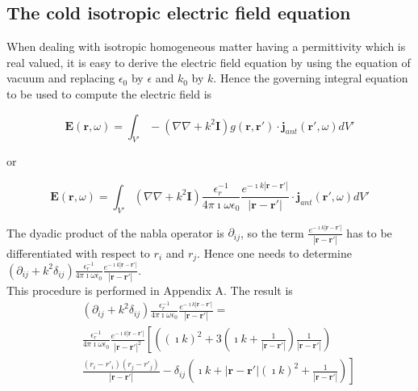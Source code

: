 \documentclass[a4paper,11pt]{thesis}
\begin{document}
\subsection{The cold isotropic electric field equation}
When dealing with isotropic homogeneous matter having a permittivity which is real valued, it is easy to derive the electric field equation by using the equation of vacuum and replacing $\epsilon_0$ by $\epsilon$ and $k_0$ by $k$. Hence the governing integral equation to be used to compute the electric field is

\begin{equation}
    \mathbf{E}(\mathbf{r},\omega)=\int_{V'} -\left(  \nabla  \nabla   + k^2 \mathbf{I} \right) g(\mathbf{r},\mathbf{r'})\cdot \mathbf{j}_{ant}(\mathbf{r'},\omega) dV'\label{E_vacuum}
\end{equation}

or

\begin{equation}
    \mathbf{E}(\mathbf{r},\omega)=\int_{V'} \left(  \nabla  \nabla   + k^2 \mathbf{I} \right) \frac{\epsilon_r^{-1}}{4 \pi \imath \omega \epsilon_0} \frac{e^{- \imath k | \mathbf{r}-\mathbf{r'} |}}{| \mathbf{r}-\mathbf{r'} |}\cdot \mathbf{j}_{ant}(\mathbf{r'},\omega) dV'\label{E_vacuum_2}
\end{equation}

The dyadic product of the nabla operator is $\partial_{ij}$, so the term $\frac{e^{- \imath k  | \mathbf{r}-\mathbf{r'} |}}{| \mathbf{r}-\mathbf{r'} |}$ has to be differentiated with respect to $r_i$ and $r_j$. Hence one needs to determine $\left(  \partial_{ij}   + k^2 \delta_{ij} \right) \frac{\epsilon_r^{-1}}{4 \pi \imath \omega \epsilon_0} \frac{e^{- \imath k  | \mathbf{r}-\mathbf{r'} |}}{| \mathbf{r}-\mathbf{r'} |}$.\\

This procedure is performed in Appendix A. The result is
\label{derive}
\begin{eqnarray}
&&\left(  \partial_{ij}   + k^2 \delta_{ij} \right) \frac{\epsilon_r^{-1}}{4 \pi \imath \omega \epsilon_0} \frac{e^{- \imath k  | \mathbf{r}-\mathbf{r'} |}}{| \mathbf{r}-\mathbf{r'} |}=\\
&&  \frac{\epsilon_r^{-1}}{4 \pi \imath \omega \epsilon_0} \frac{e^{- \imath k | \mathbf{r}-\mathbf{r'}|}}{| \mathbf{r}-\mathbf{r'}|^2}\left[ \left( ( \imath k)^2+ 3 \left( \imath k + \frac{1}{| \mathbf{r}-\mathbf{r'}|} \right)\frac{1}{| \mathbf{r}-\mathbf{r'}|} \right) \right.\nonumber \\
&&\left. \frac{(r_i-r'_i)(r_j-r'_j)}{| \mathbf{r}-\mathbf{r'}|}-  \delta_{ij} \left(   \imath k+| \mathbf{r}-\mathbf{r'}|(\imath k)^2 + \frac{1}{| \mathbf{r}-\mathbf{r'}|}\right) \right]\nonumber
 \end{eqnarray}
\end{document}
